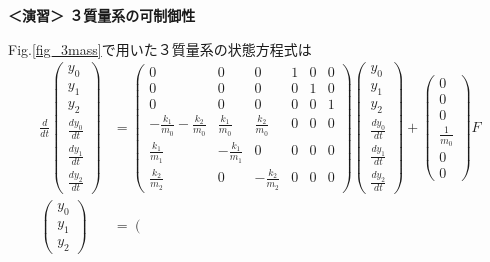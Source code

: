 \noindent
{\bf ＜演習＞ ３質量系の可制御性}\nopagebreak

Fig.\ref{fig_3mass}で用いた３質量系の状態方程式は
\begin{align}
 \frac{d}{dt} \left(\begin{array}{c}
	         y_0 \\
		     y_1 \\
		     y_2 \\
		     \frac{dy_0}{dt} \\
		     \frac{dy_1}{dt} \\
		     \frac{dy_2}{dt}
		    \end{array}\right)
 &=
 \left(\begin{array}{cccccc}
        0 & 0 & 0 & 1 & 0 & 0      \\
        0 & 0 & 0 & 0 & 1 & 0      \\
        0 & 0 & 0 & 0 & 0 & 1      \\
	-\frac{k_1}{m_0} -\frac{k_2}{m_0}&  \frac{k_1}{m_0} &  \frac{k_2}{m_0} & 0 & 0 & 0 \\
	 \frac{k_1}{m_1}                & -\frac{k_1}{m_1} &  0               & 0 & 0 & 0 \\
	 \frac{k_2}{m_2}                &  0               & -\frac{k_2}{m_2} & 0 & 0 & 0 
       \end{array}\right)
 \left(\begin{array}{c}
	         y_0 \\
		     y_1 \\
		     y_2 \\
		     \frac{dy_0}{dt} \\
		     \frac{dy_1}{dt} \\
		     \frac{dy_2}{dt}
       \end{array}\right)
 +
 \left(\begin{array}{c}
        0 \\
        0 \\
        0 \\
	    \frac{1}{m_0} \\
	    0 \\
	    0 
       \end{array}\right)
        F
\nonumber
\\
 \left(\begin{array}{c}
	    y_0 \\
		y_1 \\
		y_2
       \end{array}\right)
 &=
 \left(\begin{array}{cccccc}

\end{array}
\end{align}
